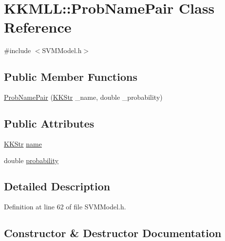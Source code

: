 \hypertarget{class_k_k_m_l_l_1_1_prob_name_pair}{}\section{K\+K\+M\+LL\+:\+:Prob\+Name\+Pair Class Reference}
\label{class_k_k_m_l_l_1_1_prob_name_pair}


{\ttfamily \#include $<$S\+V\+M\+Model.\+h$>$}

\subsection*{Public Member Functions}
\begin{DoxyCompactItemize}
\item 
\hyperlink{class_k_k_m_l_l_1_1_prob_name_pair_a3f0f4f2d3e8299e093b0e9752757562b}{Prob\+Name\+Pair} (\hyperlink{class_k_k_b_1_1_k_k_str}{K\+K\+Str} \+\_\+name, double \+\_\+probability)
\end{DoxyCompactItemize}
\subsection*{Public Attributes}
\begin{DoxyCompactItemize}
\item 
\hyperlink{class_k_k_b_1_1_k_k_str}{K\+K\+Str} \hyperlink{class_k_k_m_l_l_1_1_prob_name_pair_a4b5ae078560911240aa6a38128440089}{name}
\item 
double \hyperlink{class_k_k_m_l_l_1_1_prob_name_pair_ad80cd8e0d4b96ddeed6791d72b19d4a5}{probability}
\end{DoxyCompactItemize}


\subsection{Detailed Description}


Definition at line 62 of file S\+V\+M\+Model.\+h.



\subsection{Constructor \& Destructor Documentation}
